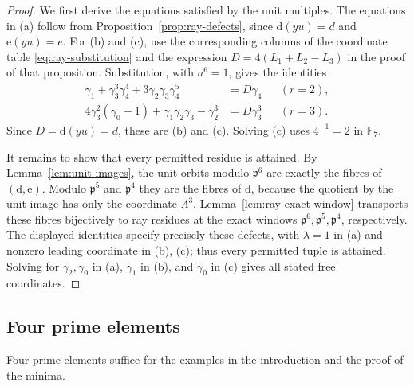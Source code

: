 \documentclass[11pt]{amsart}
\theoremstyle{plain}
\theoremstyle{definition}
\numberwithin{equation}{section}
\newcommand{\F}{\mathbb F}
\newcommand{\pp}{\mathfrak p}
\newcommand{\dd}{\mathrm d}
\newcommand{\ee}{\mathrm e}
\begin{document}
\begin{proof}
We first derive the equations satisfied by the unit multiples.
The equations in (a) follow from Proposition~\ref{prop:ray-defects},
since $\dd(yu)=d$ and $\ee(yu)=e$.
For (b) and (c), use the corresponding columns of the coordinate
table \eqref{eq:ray-substitution} and the expression
$D=4(L_1+L_2-L_3)$ in the proof of that proposition.
Substitution, with $a^6=1$,
gives the identities
\begin{align*}
 \gamma_1+\gamma_3^3\gamma_4^4
                 +3\gamma_2\gamma_3\gamma_4^5&=D\gamma_4
                    &&(r=2),\\
 4\gamma_3^2(\gamma_0-1)+\gamma_1\gamma_2\gamma_3-\gamma_2^3
                 &=D\gamma_3^3&&(r=3).
\end{align*}
Since $D=\dd(yu)=d$, these are (b) and (c). Solving (c) uses
$4^{-1}=2$ in $\F_7$.

It remains to show that every permitted residue is attained.
By Lemma~\ref{lem:unit-images}, the unit orbits modulo $\pp^6$
are exactly the fibres of $(\dd,\ee)$. Modulo $\pp^5$ and $\pp^4$ they are the
fibres of $\dd$, because the quotient by the unit image has only
the coordinate $\Lambda^3$. Lemma~\ref{lem:ray-exact-window}
transports these fibres bijectively to ray residues at the exact
windows $\pp^6,\pp^5,\pp^4$, respectively. The displayed identities
specify precisely these defects, with $\lambda=1$ in (a) and
nonzero leading coordinate in (b), (c); thus every permitted tuple
is attained. Solving for
$\gamma_2,\gamma_0$ in (a), $\gamma_1$ in (b), and $\gamma_0$ in
(c) gives all stated free coordinates.
\end{proof}


\subsection{Four prime elements}

Four prime elements suffice for the examples in the introduction
and the proof of the minima.
\end{document}
